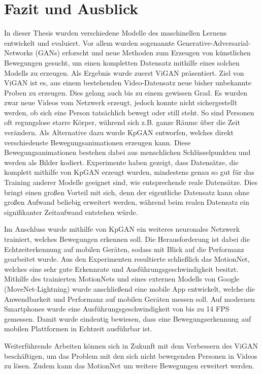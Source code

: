 \chapter{Fazit und Ausblick}
In dieser Thesis wurden verschiedene Modelle des maschinellen Lernens
entwickelt und evaluiert. Vor allem wurden sogenannte
Generative-Adversarial-Networks (GANs) erforscht und neue Methoden zum Erzeugen
von künstlichen Bewegungen gesucht, um einen kompletten Datensatz mithilfe
eines solchen Modells zu erzeugen. Als Ergebnis wurde zuerst ViGAN präsentiert.
Ziel von ViGAN ist es, aus einem bestehenden Video-Datensatz neue bisher unbekannte
Proben zu erzeugen. Dies gelang auch bis zu einem gewissen Grad. Es wurden zwar
neue Videos vom Netzwerk erzeugt, jedoch konnte nicht sichergestellt werden, ob sich
eine Person tatsächlich bewegt oder still steht. So sind Personen oft
regungslose starre Körper, während sich z.B. ganze Räume über die Zeit
verändern. Als Alternative dazu wurde KpGAN entworfen, welches direkt
verschiedenste Bewegungsanimationen erzeugen kann. Diese Bewegungsanimationen
bestehen dabei aus menschlichen Schlüsselpunkten und werden als Bilder kodiert.
Experimente haben gezeigt, dass Datensätze, die komplett mithilfe von KpGAN
erzeugt wurden, mindestens genau so gut für das Training anderer Modelle
geeignet sind, wie entsprechende reale Datensätze. Dies bringt einen großen Vorteil mit sich,
denn der eigentliche Datensatz kann ohne großen Aufwand beliebig erweitert werden, während
beim realen Datensatz ein signifikanter Zeitaufwand entstehen würde.

Im Anschluss wurde mithilfe von KpGAN ein weiteres neuronales Netzwerk
trainiert, welches Bewegungen erkennen soll. Die Herausforderung ist dabei die
Echtzeiterkennung auf mobilen Geräten, sodass mit Blick auf die Performanz
gearbeitet wurde. Aus den Experimenten resultierte schließlich das MotionNet,
welches eine sehr gute Erkennrate und Ausführungsgeschwindigkeit besitzt.
Mithilfe des trainierten MotionNets und eines externen Modells von Google
(MoveNet-Lightning) wurde anschließend eine mobile App entwickelt, welche die
Anwendbarkeit und Performanz auf mobilen Geräten messen soll. Auf modernen
Smartphones wurde eine Ausführungsgeschwindigkeit von bis zu 14 FPS gemessen.
Damit wurde eindeutig bewiesen, dass eine Bewegungserkennung auf mobilen
Plattformen in Echtzeit ausführbar ist.

Weiterführende Arbeiten können sich in Zukunft mit dem Verbessern des ViGAN
be\-schäf\-tigen, um das Problem mit den sich nicht bewegenden Personen in
Videos zu lösen. Zudem kann das MotionNet um weitere Bewegungen erweitert
werden.